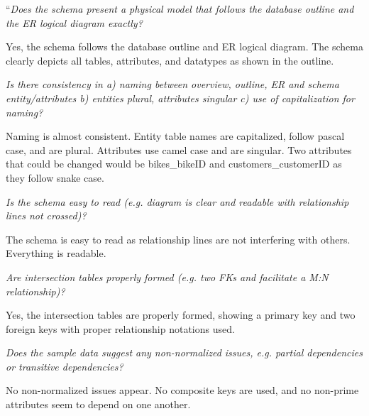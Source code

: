 \documentclass{article}
\begin{document}
\vspace{0.2cm}

\begin{tcolorbox}[colback=secondarycolor, colframe=primarycolor, title=\textbf{Step 2: Peer Review 2 - Daniel Guardado}]
``\textit{Does the schema present a physical model that follows the database outline and the ER logical diagram exactly?}

\vspace{0.05cm}
Yes, the schema follows the database outline and ER logical diagram. The schema clearly depicts all tables, attributes, and datatypes as shown in the outline.  

\vspace{0.2cm}
\textit{Is there consistency in a) naming between overview, outline, ER and schema entity/attributes b) entities plural, attributes singular c) use of capitalization for naming?}

\vspace{0.05cm}
Naming is almost consistent. Entity table names are capitalized, follow pascal case, and are plural. Attributes use camel case and are singular. Two attributes that could be changed would be bikes\_bikeID and customers\_customerID as they follow snake case. 

\vspace{0.2cm}
\textit{Is the schema easy to read (e.g. diagram is clear and readable with relationship lines not crossed)?}

\vspace{0.05cm}
The schema is easy to read as relationship lines are not interfering with others. Everything is readable. 

\vspace{0.2cm}
\textit{Are intersection tables properly formed (e.g. two FKs and facilitate a M:N relationship)?}

\vspace{0.05cm}
Yes, the intersection tables are properly formed, showing a primary key and two foreign keys with proper relationship notations used. 

\vspace{0.2cm}
\textit{Does the sample data suggest any non-normalized issues, e.g. partial dependencies or transitive dependencies?}

\vspace{0.05cm}
No non-normalized issues appear. No composite keys are used, and no non-prime attributes seem to depend on one another. 


\end{tcolorbox}
\end{document}
